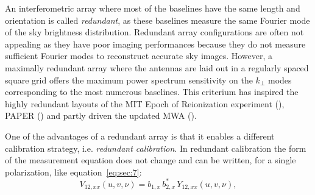 An interferometric array where most of the baselines have the same length and orientation is called {\it redundant}, as these baselines measure the same Fourier mode of the sky brightness distribution. Redundant array configurations are often not appealing as they have poor imaging performances because they do not measure sufficient Fourier modes to reconstruct accurate sky images. However, a maximally redundant array where the antennas are laid out in a regularly spaced square grid offers the maximum power spectrum sensitivity on the $k_\perp$ modes corresponding to the most numerous baselines. This criterium has inspired the highly redundant layouts of the MIT Epoch of Reionization experiment (\cite{zheng14}), PAPER (\cite{parsons12b}) and partly driven the updated MWA (\cite{wayth18}).

One of the advantages of a redundant array is that it enables a different calibration strategy, i.e. {\it redundant calibration}. In redundant calibration the form of the measurement equation does not change and can be written, for a single polarization, like equation~\ref{eq:sec:7}:
\begin{equation}
V_{12,xx} (u,v,\nu) = b_{1,x} \, b_{2,x}^* \, Y_{12,xx} (u,v,\nu),
\label{eq:sec:13}
\end{equation}
